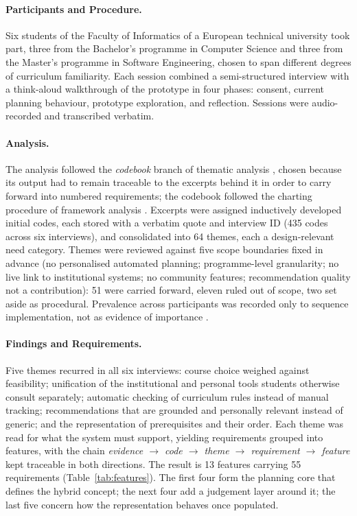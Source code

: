 \documentclass[a4paper,twoside]{article}
\begin{document}
\paragraph{Participants and Procedure.}
Six students of the Faculty of Informatics of a European technical university took part, three from the Bachelor's programme in Computer Science and three from the Master's programme in Software Engineering, chosen to span different degrees of curriculum familiarity. Each session combined a semi-structured interview with a think-aloud walkthrough of the prototype in four phases: consent, current planning behaviour, prototype exploration, and reflection. Sessions were audio-recorded and transcribed verbatim.

\paragraph{Analysis.}
The analysis followed the \emph{codebook} branch of thematic analysis \cite{braun_thematic_2022}, chosen because its output had to remain traceable to the excerpts behind it in order to carry forward into numbered requirements; the codebook followed the charting procedure of framework analysis \cite{gale_using_2013}. Excerpts were assigned inductively developed initial codes, each stored with a verbatim quote and interview ID (435 codes across six interviews), and consolidated into 64 themes, each a design-relevant need category. Themes were reviewed against five scope boundaries fixed in advance (no personalised automated planning; programme-level granularity; no live link to institutional systems; no community features; recommendation quality not a contribution): 51 were carried forward, eleven ruled out of scope, two set aside as procedural. Prevalence across participants was recorded only to sequence implementation, not as evidence of importance \cite{braun_thematic_2022}.

\paragraph{Findings and Requirements.}
Five themes recurred in all six interviews: course choice weighed against feasibility; unification of the institutional and personal tools students otherwise consult separately; automatic checking of curriculum rules instead of manual tracking; recommendations that are grounded and personally relevant instead of generic; and the representation of prerequisites and their order. Each theme was read for what the system must support, yielding requirements grouped into features, with the chain \emph{evidence $\rightarrow$ code $\rightarrow$ theme $\rightarrow$ requirement $\rightarrow$ feature} kept traceable in both directions. The result is 13 features carrying 55 requirements (Table~\ref{tab:features}). The first four form the planning core that defines the hybrid concept; the next four add a judgement layer around it; the last five concern how the representation behaves once populated.
\end{document}
